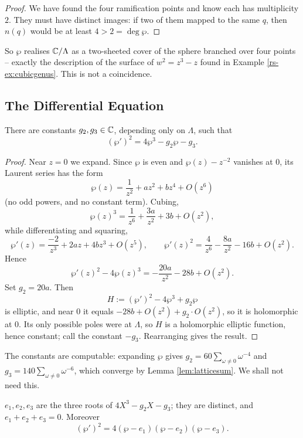 \documentclass[a4paper]{scrartcl}
\begin{document}
\begin{proof}
	We have found the four ramification points and know each has multiplicity $2$. They
	must have distinct images: if two of them mapped to the same $q$, then $n(q)$ would be
	at least $4 > 2 = \deg\wp$.
\end{proof}

So $\wp$ realises $\mathbb{C}/\Lambda$ as a two-sheeted cover of the sphere branched over four
points -- exactly the description of the surface of $w^2 = z^3-z$ found in Example
\ref{rs-ex:cubicgenus}. This is not a coincidence.

\subsection{The Differential Equation}

\begin{proposition}\label{prop:wpode}
	There are constants $g_2, g_3 \in \mathbb{C}$, depending only on $\Lambda$, such that
	$$
	(\wp')^2 = 4\wp^3 - g_2\wp - g_3.
	$$
\end{proposition}

\begin{proof}
	Near $z = 0$ we expand. Since $\wp$ is even and $\wp(z) - z^{-2}$ vanishes at $0$, its
	Laurent series has the form
	$$
	\wp(z) = \frac{1}{z^2} + az^2 + bz^4 + O(z^6)
	$$
	(no odd powers, and no constant term). Cubing,
	$$
	\wp(z)^3 = \frac{1}{z^6} + \frac{3a}{z^2} + 3b + O(z^2),
	$$
	while differentiating and squaring,
	$$
	\wp'(z) = \frac{-2}{z^3}+2az+4bz^3+O(z^5), \qquad
	\wp'(z)^2 = \frac{4}{z^6} - \frac{8a}{z^2} - 16 b + O(z^2).
	$$
	Hence
	$$
	\wp'(z)^2 - 4\wp(z)^3 = -\frac{20a}{z^2} - 28b + O(z^2).
	$$
	Set $g_2 = 20a$. Then
	$$
	H := (\wp')^2 - 4\wp^3 + g_2\wp
	$$
	is elliptic, and near $0$ it equals $-28b + O(z^2) + g_2 \cdot O(z^2)$, so it is
	holomorphic at $0$. Its only possible poles were at $\Lambda$, so $H$ is a holomorphic
	elliptic function, hence constant; call the constant $-g_3$. Rearranging gives the
	result.
\end{proof}

\begin{remark}
	The constants are computable: expanding $\wp$ gives
	$g_2 = 60\sum_{\omega\neq0}\omega^{-4}$ and $g_3 = 140\sum_{\omega\neq0}\omega^{-6}$,
	which converge by Lemma \ref{lem:latticesum}. We shall not need this.
\end{remark}

\begin{corollary}\label{cor:eiroots}
	$e_1, e_2, e_3$ are the three roots of $4X^3 - g_2X - g_3$; they are distinct, and
	$e_1+e_2+e_3 = 0$. Moreover
	$$
	(\wp')^2 = 4(\wp - e_1)(\wp-e_2)(\wp-e_3).
	$$
\end{corollary}
\end{document}
